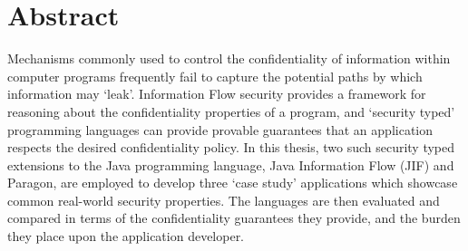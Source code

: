 
\chapter{Abstract}

Mechanisms commonly used to control the confidentiality of information within computer programs frequently fail to capture the potential paths by which information may `leak'. Information Flow security provides a framework for reasoning about the confidentiality properties of a program, and `security typed' programming languages can provide provable guarantees that an application respects the desired confidentiality policy. In this thesis, two such security typed extensions to the Java programming language, Java Information Flow (JIF) and Paragon, are employed to develop three `case study' applications which showcase common real-world security properties. The languages are then evaluated and compared in terms of the confidentiality guarantees they provide, and the burden they place upon the application developer.